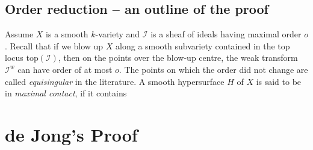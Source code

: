 \documentclass[12pt,a4paper,leqno]{article}
\theoremstyle{plain}
\theoremstyle{definition}
\theoremstyle{remark}
\begin{document}
\subsection{Order reduction -- an outline of the proof}

Assume $X$ is a smooth $k$-variety and $\mathscr{I}$ is a sheaf of ideals having maximal order $o$. Recall that if we blow up $X$ along a smooth subvariety contained in the top locus $\mathrm{top} (\mathscr{I})$, then on the points over the blow-up centre, the weak transform $\mathscr{I}^w$ can have order of at most $o$. The points on which the order did not change are called \emph{equisingular} in the literature. A smooth hypersurface $H$ of $X$ is said to be in \emph{maximal contact}, if it contains 
 
\section{de Jong's Proof}\label{deJongRes}
\end{document}
